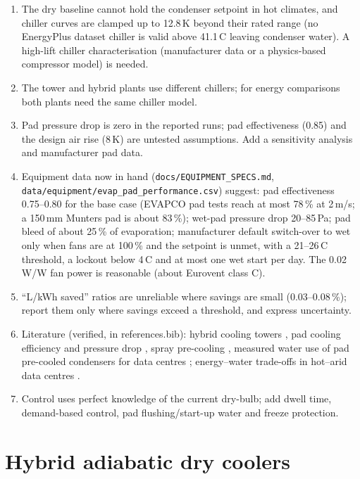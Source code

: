 \documentclass[preprint,12pt,authoryear]{elsarticle}
\begin{document}
\begin{enumerate}
\item The dry baseline cannot hold the condenser setpoint in hot climates, and chiller curves are clamped up to 12.8\,K
beyond their rated range (no EnergyPlus dataset chiller is valid above 41.1\,\textdegree C leaving condenser water). A high-lift
chiller characterisation (manufacturer data or a physics-based compressor model) is needed.
\item The tower and hybrid plants use different chillers; for energy comparisons both plants need the same chiller model.
\item Pad pressure drop is zero in the reported runs; pad effectiveness (0.85) and the design air rise (8\,K) are untested
assumptions. Add a sensitivity analysis and manufacturer pad data.
\item Equipment data now in hand (\texttt{docs/EQUIPMENT\_SPECS.md}, \texttt{data/equipment/evap\_pad\_performance.csv}) suggest:
pad effectiveness 0.75--0.80 for the base case (EVAPCO pad tests reach at most 78\,\% at 2\,m/s; a 150\,mm Munters pad is about
83\,\%); wet-pad pressure drop 20--85\,Pa; pad bleed of about 25\,\% of evaporation; manufacturer default switch-over to wet
only when fans are at 100\,\% and the setpoint is unmet, with a 21--26\,\textdegree C threshold, a lockout below
4\,\textdegree C and at most one wet start per day. The 0.02\,W/W fan power is reasonable (about Eurovent class C).
\item ``L/kWh saved'' ratios are unreliable where savings are small (0.03--0.08\,\%); report them only where savings exceed
a threshold, and express uncertainty.
\item Literature (verified, in references.bib): hybrid cooling towers \citep{asvapoositkul2014comparative}, pad
cooling efficiency and pressure drop \citep{he2014experimental}, spray pre-cooling \citep{alkhedhair2013numerical,yang2020experimental},
measured water use of pad pre-cooled condensers for data centres \citep{ndukaife2019optimization}; energy--water
trade-offs in hot--arid data centres \citep{karimi2022water,karimi2025energy}.
\item Control uses perfect knowledge of the current dry-bulb; add dwell time, demand-based control, pad flushing/start-up
water and freeze protection.
\end{enumerate}

\section{Hybrid adiabatic dry coolers}\label{sec:hybrid}
\end{document}
